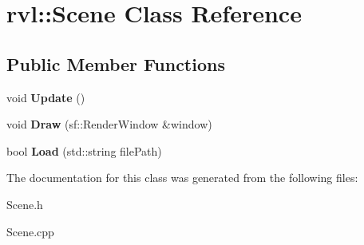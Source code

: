 \hypertarget{classrvl_1_1_scene}{}\section{rvl\+:\+:Scene Class Reference}
\label{classrvl_1_1_scene}
\subsection*{Public Member Functions}
\begin{DoxyCompactItemize}
\item 
\mbox{\label{classrvl_1_1_scene_ae6675125abb9ee6dc2e1be81aef3e270}} 
void {\bfseries Update} ()
\item 
\mbox{\label{classrvl_1_1_scene_a62dd092ce10da061bb2bbb49eb0607db}} 
void {\bfseries Draw} (sf\+::\+Render\+Window \&window)
\item 
\mbox{\label{classrvl_1_1_scene_ab871b7005408e83aaf2df91051338c5f}} 
bool {\bfseries Load} (std\+::string file\+Path)
\end{DoxyCompactItemize}


The documentation for this class was generated from the following files\+:\begin{DoxyCompactItemize}
\item 
Scene.\+h\item 
Scene.\+cpp\end{DoxyCompactItemize}
